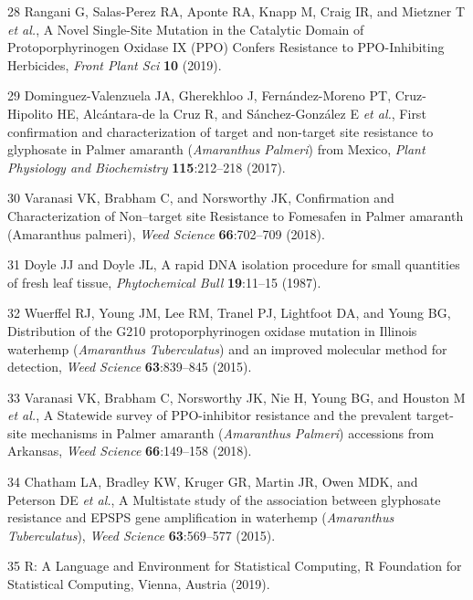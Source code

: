 \documentclass[
  12pt,
  a4paper]{article}
\begin{document}
\leavevmode\hypertarget{ref-rangani_novel_2019}{}%
28 Rangani G, Salas-Perez RA, Aponte RA, Knapp M, Craig IR, and Mietzner
T \emph{et al.}, A Novel Single-Site Mutation in the Catalytic Domain of
Protoporphyrinogen Oxidase IX (PPO) Confers Resistance to PPO-Inhibiting
Herbicides, \emph{Front Plant Sci} \textbf{10} (2019).

\leavevmode\hypertarget{ref-dominguez-valenzuela_first_2017}{}%
29 Dominguez-Valenzuela JA, Gherekhloo J, Fernández-Moreno PT,
Cruz-Hipolito HE, Alcántara-de la Cruz R, and Sánchez-González E
\emph{et al.}, First confirmation and characterization of target and
non-target site resistance to glyphosate in Palmer amaranth
(\emph{Amaranthus} \emph{Palmeri}) from Mexico, \emph{Plant Physiology
and Biochemistry} \textbf{115}:212--218 (2017).

\leavevmode\hypertarget{ref-varanasi_confirmation_2018}{}%
30 Varanasi VK, Brabham C, and Norsworthy JK, Confirmation and
Characterization of Non--target site Resistance to Fomesafen in Palmer
amaranth (Amaranthus palmeri), \emph{Weed Science} \textbf{66}:702--709
(2018).

\leavevmode\hypertarget{ref-doyle_rapid_1987}{}%
31 Doyle JJ and Doyle JL, A rapid DNA isolation procedure for small
quantities of fresh leaf tissue, \emph{Phytochemical Bull}
\textbf{19}:11--15 (1987).

\leavevmode\hypertarget{ref-wuerffel_distribution_2015}{}%
32 Wuerffel RJ, Young JM, Lee RM, Tranel PJ, Lightfoot DA, and Young BG,
Distribution of the G210 protoporphyrinogen oxidase mutation in Illinois
waterhemp (\emph{Amaranthus} \emph{Tuberculatus}) and an improved
molecular method for detection, \emph{Weed Science} \textbf{63}:839--845
(2015).

\leavevmode\hypertarget{ref-varanasi_statewide_2018}{}%
33 Varanasi VK, Brabham C, Norsworthy JK, Nie H, Young BG, and Houston M
\emph{et al.}, A Statewide survey of PPO-inhibitor resistance and the
prevalent target-site mechanisms in Palmer amaranth (\emph{Amaranthus}
\emph{Palmeri}) accessions from Arkansas, \emph{Weed Science}
\textbf{66}:149--158 (2018).

\leavevmode\hypertarget{ref-chatham_multistate_2015}{}%
34 Chatham LA, Bradley KW, Kruger GR, Martin JR, Owen MDK, and Peterson
DE \emph{et al.}, A Multistate study of the association between
glyphosate resistance and EPSPS gene amplification in waterhemp
(\emph{Amaranthus} \emph{Tuberculatus}), \emph{Weed Science}
\textbf{63}:569--577 (2015).

\leavevmode\hypertarget{ref-r_core_team_r:_2019}{}%
35 R: A Language and Environment for Statistical Computing, R Foundation
for Statistical Computing, Vienna, Austria (2019).
\end{document}
